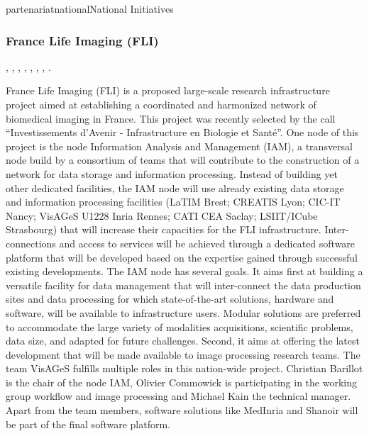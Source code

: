 \documentclass{ra2018}
\begin{document}
\begin{module}{partenariat}{national}{National Initiatives}
        \subsubsection{France Life Imaging (FLI)}
        \begin{participants}    	
          , 	
          ,
          ,
          ,
          ,
          ,
          ,
          .
        \end{participants}  
        
        France Life Imaging (FLI) is a proposed large-scale research infrastructure
        project aimed at establishing a coordinated and harmonized network of
        biomedical imaging in France. This project was recently selected by the call
        ``Investissements d’Avenir - Infrastructure en Biologie et Santé''. One node of
        this project is the node Information Analysis and Management (IAM), a
        transversal node build by a consortium of teams that will contribute to the
        construction of a network for data storage and information processing. Instead
        of building yet other dedicated facilities, the IAM node will use already
        existing data storage and information processing facilities (LaTIM Brest;
        CREATIS Lyon; CIC-IT Nancy; VisAGeS U1228 Inria Rennes; CATI CEA Saclay;
        LSIIT/ICube Strasbourg) that will increase their capacities for the FLI
        infrastructure. Inter-connections and access to services will be achieved
        through a dedicated software platform that will be developed based on the
        expertise gained through successful existing developments.  The IAM node has
        several goals. It aims first at building a versatile facility for data
        management that will inter-connect the data production sites and data
        processing for which state-of-the-art solutions, hardware and software, will be
        available to infrastructure users. Modular solutions are preferred to
        accommodate the large variety of modalities acquisitions, scientific problems,
        data size, and adapted for future challenges. Second, it aims at offering the
        latest development that will be made available to image processing research
        teams.  The team VisAGeS fulfills multiple roles in this nation-wide project.
        Christian Barillot is the chair of the node IAM, Olivier Commowick is
        participating in the working group workflow and image processing and Michael
        Kain the technical manager. Apart from the team members, software solutions
        like MedInria and Shanoir will be part of the final software platform.
        

\end{module}
\end{document}
